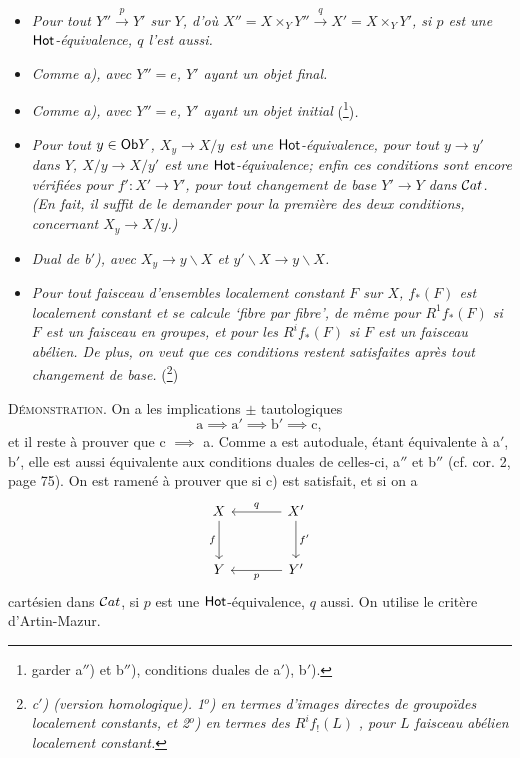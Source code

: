 \begin{itemize}[leftmargin=3em]
\item[\textit{a)}] \textit{Pour tout $Y'' \xrightarrow{p} Y'$ sur $Y$, d'où $X'' = X \times_Y Y'' \xrightarrow{q} X' = X \times_Y Y'$, si $p$ est une} $\mathsf{Hot}$\textit{-équivalence, $q$ l'est aussi.}

\item[\textit{a$'$)}] \textit{Comme a), avec $Y'' = e$, $Y'$ ayant un objet final.}

\item[\textit{a$''$)}] \textit{Comme a), avec $Y'' = e$, $Y'$ ayant un objet initial} (\footnote{garder a$''$) et b$''$), conditions duales de a$'$), b$'$).})\textit{.}

\item[\textit{b$'$)}] \textit{Pour tout $y \in \mathsf{Ob} Y$, $X_y \longrightarrow X/y$ est une} $\mathsf{Hot}$\textit{-équivalence, pour tout $y \longrightarrow y'$ dans $Y$, $X/y \longrightarrow X/y'$ est une} $\mathsf{Hot}$\textit{-équivalence; enfin ces conditions sont encore vérifiées pour $f' : X' \longrightarrow Y'$, pour tout changement de base $Y' \longrightarrow Y$ dans} $\mathcal{C}at$\textit{. (En fait, il suffit de le demander pour la première des deux conditions, concernant $X_y \longrightarrow X/y$.)}

\item[\textit{b$''$)}] \textit{Dual de b$'$), avec $X_y \longrightarrow y\backslash X$ et $y'\backslash X \longrightarrow y\backslash X$.}

\item[\textit{c)}] \textit{Pour tout faisceau d'ensembles localement constant $F$ sur $X$, $f_*(F)$ est localement constant et se calcule `fibre par fibre', de même pour $R^1 f_*(F)$ si $F$ est un faisceau en groupes, et pour les $R^i f_*(F)$ si $F$ est un faisceau abélien. De plus, on veut que ces conditions restent satisfaites après tout changement de base.} (\footnote{\textit{c$'$) (version homologique). 1$^o$) en termes d'images directes de groupoïdes localement constants, et 2$^o$) en termes des $R^i f_!(L)$} \textit{, pour $L$ faisceau abélien localement constant.}})
\end{itemize}

\noindent\textsc{Démonstration}. On a les implications $\pm$ tautologiques
\[
\mathrm{a} \implies \mathrm{a}' \implies \mathrm{b}' \implies \mathrm{c},
\]
et il reste à prouver que c $\implies$ a. Comme a est autoduale, étant équivalente à a$'$, b$'$, elle est aussi équivalente aux conditions duales de celles-ci, a$''$ et b$''$ (cf. cor. 2, page 75). On est ramené à prouver que si c) est satisfait, et si on a
\[
\begin{tikzcd}[row sep=large, column sep=large]
X \arrow[d, "f"'] & X' \arrow[l, "q"'] \arrow[d, "f'"] \\
Y & Y' \arrow[l, "p"]
\end{tikzcd}
\]
cartésien dans $\mathcal{C}at$, si $p$ est une $\mathsf{Hot}$-équivalence, $q$ aussi. On utilise le critère d'Artin-Mazur.

